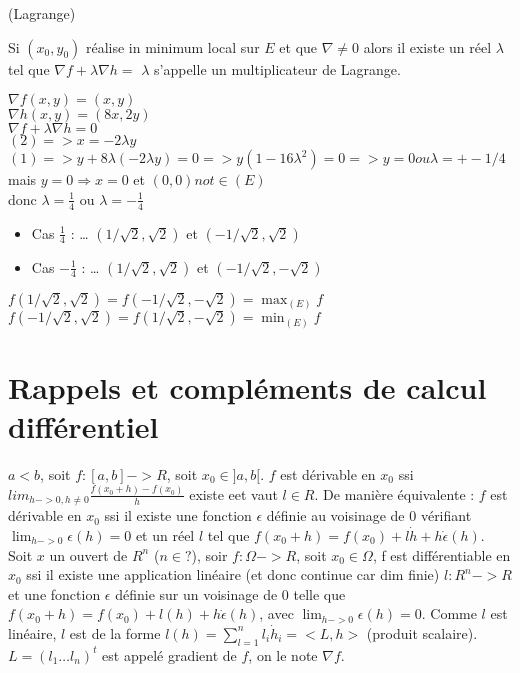 		\begin{theoreme} (Lagrange)
		
		Si $(x_0, y_0)$ réalise in minimum local sur $E$ et que $\nabla \neq 0$ alors il existe un réel $\lambda$ tel que $\nabla f + \lambda \nabla h = $
		$\lambda$ s'appelle un multiplicateur de Lagrange.
		
		\end{theoreme}
		
		$\nabla f(x, y) = ( x, y)$ \\
		$\nabla h(x, y) = (8x, 2y)$ \\
		$\nabla f + \lambda \nabla h = 0$ \\
		$(2) => x = -2\lambda y$ \\
		$(1) => y+8\lambda (-2\lambda y) = 0 => y(1-16 \lambda^2) = 0 => y=0 ou \lambda = +- 1/4$ \\
		mais $y=0 \Rightarrow x=0$ et $(0, 0) not \in (E)$ \\
		donc $\lambda = \frac{1}{4}$ ou $\lambda = -\frac{1}{4}$
		
		\begin{itemize}
		\item Cas $\frac{1}{4}$ : 
		\dots
		$(1/ \sqrt{2}, \sqrt{2})$ et $(-1/ \sqrt{2}, \sqrt{2})$
		\item Cas $-\frac{1}{4}$ : 
		\dots
		$(1/ \sqrt{2}, \sqrt{2})$ et $(-1/ \sqrt{2}, -\sqrt{2})$
		\end{itemize}
		
		$f(1/ \sqrt{2}, \sqrt{2}) = f(-1/ \sqrt{2}, -\sqrt{2}) = \max_{(E)} f$
		$f(-1/ \sqrt{2}, \sqrt{2}) = f(1/ \sqrt{2}, -\sqrt{2}) = \min_{(E)} f$
		
	\section{Rappels et compléments de calcul différentiel}
	
	$a<b$, soit $f:[a, b]->R$, soit $x_0 \in ]a, b[$.
	$f$ est dérivable en $x_0$ ssi $lim_{h->0, h\neq 0} \frac{ f(x_0+h)-f(x_0) }{ h }$ existe eet vaut $l \in R$.
	De manière équivalente : $f$ est dérivable en $x_0$ ssi il existe une fonction $\epsilon$ définie au voisinage de $0$ vérifiant $\lim_{h->0} \epsilon (h) = 0$ et un réel $l$ tel que $f(x_0+h) = f(x_0)+l\dot h + h \dot \epsilon (h)$.
	Soit $x$ un ouvert de $R^n$ ($n \in ?$), soir $f:\Omega ->R$, soit $x_0 \in \Omega$, f est différentiable en $x_0$ ssi il existe une application linéaire (et donc continue car dim finie) $l:R^n->R$ et une fonction $\epsilon$ définie sur un voisinage de $0$ telle que $f(x_0+h) = f(x_0)+l(h) + h \dot \epsilon (h)$, avec $\lim_{h->0} \epsilon (h) = 0$.
	Comme $l$ est linéaire, $l$ est de la forme $l(h) = \sum _{l=1}^n l_i \dot h_i = <L,h>$ (produit scalaire). 
	$L= ( l_1 \dots l_n )^t$ 
	est appelé gradient de $f$, on le note $\nabla f$.
	

